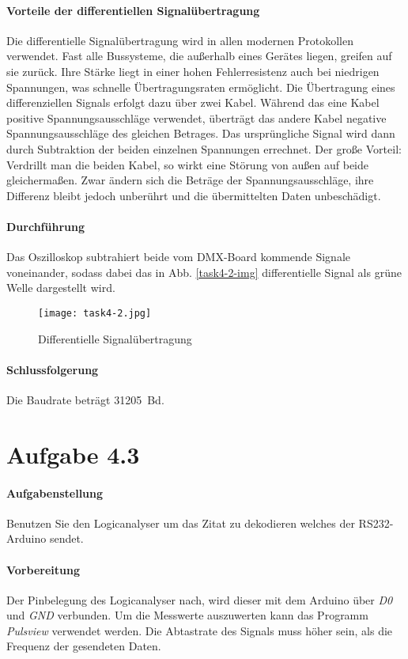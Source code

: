 \paragraph{Vorteile der differentiellen Signalübertragung}
Die differentielle Signalübertragung wird in allen modernen Protokollen verwendet. Fast alle Bussysteme, die außerhalb eines Gerätes liegen, greifen auf sie zurück. Ihre Stärke liegt in einer hohen Fehlerresistenz auch bei niedrigen Spannungen, was schnelle Übertragungsraten ermöglicht. Die Übertragung eines differenziellen Signals erfolgt dazu über zwei Kabel. Während das eine Kabel positive Spannungsausschläge verwendet, überträgt das andere Kabel negative Spannungsausschläge des gleichen Betrages. Das ursprüngliche Signal wird dann durch Subtraktion der beiden einzelnen Spannungen errechnet. Der große Vorteil: Verdrillt man die beiden Kabel, so wirkt eine Störung von außen auf beide gleichermaßen. Zwar ändern sich die Beträge der Spannungsausschläge, ihre Differenz bleibt jedoch unberührt und die übermittelten Daten unbeschädigt.

\paragraph{Durchführung}
Das Oszilloskop subtrahiert beide vom DMX-Board kommende Signale voneinander, sodass dabei das in Abb. \vref{task4-2-img} differentielle Signal als grüne Welle dargestellt wird.

\begin{figure}[!h]
	\centering
	\texttt{[image: task4-2.jpg]}
	\caption{Differentielle Signalübertragung}
	\label{task4-2-img}
\end{figure}

\paragraph{Schlussfolgerung}
Die Baudrate beträgt \SI{31205}{Bd}.

\section{Aufgabe 4.3}
\paragraph{Aufgabenstellung}
Benutzen Sie den Logicanalyser um das Zitat zu dekodieren welches der RS232-Arduino sendet.

\paragraph{Vorbereitung}
Der Pinbelegung des Logicanalyser nach, wird dieser mit dem Arduino über \textit{D0} und \textit{GND} verbunden. Um die Messwerte auszuwerten kann das Programm \textit{Pulsview} verwendet werden. Die Abtastrate des Signals muss höher sein, als die Frequenz der gesendeten Daten.

